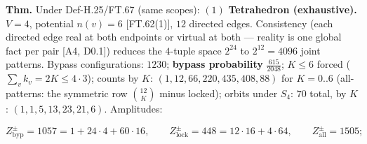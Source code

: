 \begin{theorem}\label{tag:FT-68}
\textbf{Thm.} Under Def-H.25/FT.67 (same scopes): $(1)$ \textbf{Tetrahedron (exhaustive).} $V=4$, potential $n(v)=6$ [FT.62(1)], $12$ directed edges. Consistency (each directed edge real at both endpoints or virtual at both — reality is one global fact per pair [A4, D0.1]) reduces the $4$-tuple space $2^{24}$ to $2^{12}=4096$ joint patterns. Bypass configurations: $1230$; \textbf{bypass probability} $\tfrac{615}{2048}$; $K\le6$ forced ($\sum_vk_v=2K\le4\cdot3$); counts by $K$: $(1,12,66,220,435,408,88)$ for $K=0..6$ (all-patterns: the symmetric row $\binom{12}K$ minus locked); orbits under $S_4$: $70$ total, by $K$: $(1,1,5,13,23,21,6)$. Amplitudes:

\[
Z^{\pm}_{\mathrm{byp}}=1057=1+24\cdot4+60\cdot16,\qquad Z^{\pm}_{\mathrm{lock}}=448=12\cdot16+4\cdot64,\qquad Z^{\pm}_{\mathrm{all}}=1505;
\]


\end{theorem}
